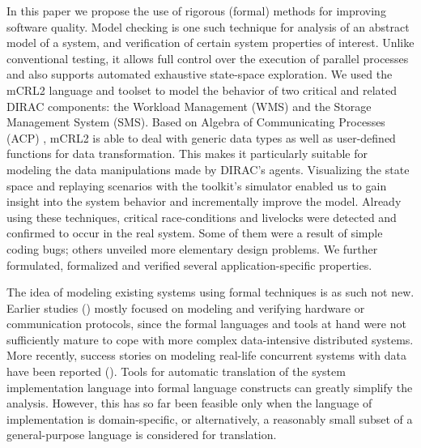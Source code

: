\documentclass[10pt,conference]{IEEEtran}
\begin{document}
In this paper we propose the use of rigorous (formal) methods for improving
software quality. Model checking \cite{ProcessesWithData} is one such technique for analysis of an
abstract model of a system, and verification of certain system properties of
interest. Unlike conventional testing, it allows full control over the execution
of parallel processes and also supports automated exhaustive state-space
exploration. We used the mCRL2 language \cite{FormalLanguagemCRL2} and toolset \cite{mCRL2Toolset} to model the behavior of two
critical and related DIRAC components: the Workload Management (WMS) and the
Storage Management System (SMS). Based on Algebra of Communicating Processes
(ACP) \cite{process_algebra}, mCRL2 is able to deal with generic data types as well as user-defined
functions for data transformation. This makes it particularly suitable for
modeling the data manipulations made by DIRAC's agents. Visualizing the state
space and replaying scenarios with the toolkit's simulator enabled us to gain
insight into the system behavior and incrementally improve the model. 
Already using these techniques, critical race-conditions and livelocks were detected and confirmed to
occur in the real system. Some of them were a result of simple coding bugs;
others unveiled more elementary design problems. We further formulated,
formalized and verified several application-specific properties.

The idea of modeling existing systems using 
formal techniques is as such not new. Earlier studies
(\cite{SPIN_case_study,sessionMgmtMasterThesis,desing_validation_protocols,protocol_verification_muCRL,SLAMToolkit,SlidingWindowProtocol,DHCP_SPIN}) mostly focused
on modeling and verifying hardware or communication protocols, since
the formal languages and tools at hand were not sufficiently mature
to cope with more complex data-intensive distributed systems. More
recently, success stories on modeling real-life concurrent systems with
data have been reported (\cite{CMS_LHC, Linux_driver,verstoep_et_al, SystemC_processAlgebra,Java_PathFinder, ACS_mCRL2}).
Tools for automatic translation of the system implementation language into
 formal language constructs can greatly
simplify the analysis. However, this has so far been feasible only when the
language of implementation is domain-specific, or alternatively, a
reasonably small subset of a general-purpose language is considered for
translation. 
\end{document}
